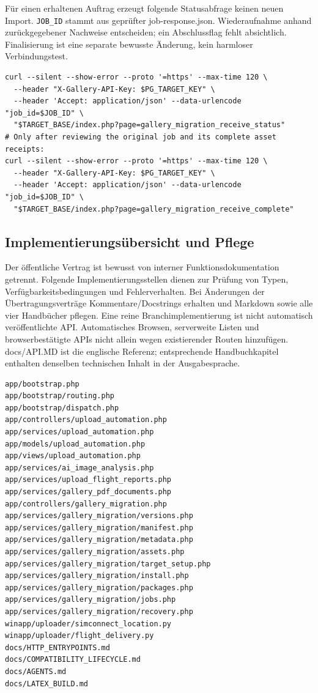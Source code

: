 \documentclass[11pt,a4paper]{article}
\newcommand{\codeword}[1]{\nolinkurl{#1}}
\begin{document}
Für einen erhaltenen Auftrag erzeugt folgende Statusabfrage keinen neuen Import.
\codeword{JOB_ID} stammt aus geprüfter job-response.json. Wiederaufnahme anhand
zurückgegebener Nachweise entscheiden; ein Abschlussflag fehlt absichtlich. Finalisierung
ist eine separate bewusste Änderung, kein harmloser Verbindungstest.

\begin{lstlisting}[language={}]
curl --silent --show-error --proto '=https' --max-time 120 \
  --header "X-Gallery-API-Key: $PG_TARGET_KEY" \
  --header 'Accept: application/json' --data-urlencode "job_id=$JOB_ID" \
  "$TARGET_BASE/index.php?page=gallery_migration_receive_status"
# Only after reviewing the original job and its complete asset receipts:
curl --silent --show-error --proto '=https' --max-time 120 \
  --header "X-Gallery-API-Key: $PG_TARGET_KEY" \
  --header 'Accept: application/json' --data-urlencode "job_id=$JOB_ID" \
  "$TARGET_BASE/index.php?page=gallery_migration_receive_complete"
\end{lstlisting}

\subsection{\texorpdfstring{Implementierungsübersicht und Pflege}{Implementierungsübersicht und Pflege}}

\label{api352:source-map}

Der öffentliche Vertrag ist bewusst von interner Funktionsdokumentation getrennt. Folgende
Implementierungsstellen dienen zur Prüfung von Typen, Verfügbarkeitsbedingungen und
Fehlerverhalten. Bei Änderungen der Übertragungsverträge Kommentare/Docstrings erhalten und
Markdown sowie alle vier Handbücher pflegen. Eine reine Branchimplementierung ist nicht
automatisch veröffentlichte API. Automatisches Browsen, serverweite Listen und
browserbestätigte APIs nicht allein wegen existierender Routen hinzufügen. docs/API.MD ist
die englische Referenz; entsprechende Handbuchkapitel enthalten denselben technischen Inhalt
in der Ausgabesprache.

\begin{lstlisting}[language={}]
app/bootstrap.php
app/bootstrap/routing.php
app/bootstrap/dispatch.php
app/controllers/upload_automation.php
app/services/upload_automation.php
app/models/upload_automation.php
app/views/upload_automation.php
app/services/ai_image_analysis.php
app/services/upload_flight_reports.php
app/services/gallery_pdf_documents.php
app/controllers/gallery_migration.php
app/services/gallery_migration/versions.php
app/services/gallery_migration/manifest.php
app/services/gallery_migration/metadata.php
app/services/gallery_migration/assets.php
app/services/gallery_migration/target_setup.php
app/services/gallery_migration/install.php
app/services/gallery_migration/packages.php
app/services/gallery_migration/jobs.php
app/services/gallery_migration/recovery.php
winapp/uploader/simconnect_location.py
winapp/uploader/flight_delivery.py
docs/HTTP_ENTRYPOINTS.md
docs/COMPATIBILITY_LIFECYCLE.md
docs/AGENTS.md
docs/LATEX_BUILD.md
\end{lstlisting}
\end{document}
